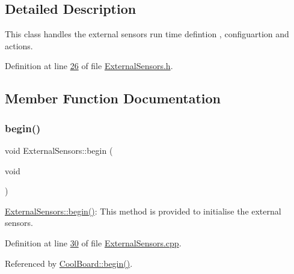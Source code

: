 \subsection{Detailed Description}
This class handles the external sensors run time defintion , configuartion and actions. 

Definition at line \hyperlink{_external_sensors_8h_source_l00026}{26} of file \hyperlink{_external_sensors_8h_source}{External\+Sensors.\+h}.



\subsection{Member Function Documentation}
\mbox{\label{class_external_sensors_a58ede0d786a86417254708870f04a21e}} 
\subsubsection{\texorpdfstring{begin()}{begin()}}
{\footnotesize\ttfamily void External\+Sensors\+::begin (\begin{DoxyParamCaption}\item[{void}]{ }\end{DoxyParamCaption})}

\hyperlink{class_external_sensors_a58ede0d786a86417254708870f04a21e}{External\+Sensors\+::begin()}\+: This method is provided to initialise the external sensors. 

Definition at line \hyperlink{_external_sensors_8cpp_source_l00030}{30} of file \hyperlink{_external_sensors_8cpp_source}{External\+Sensors.\+cpp}.



Referenced by \hyperlink{_cool_board_8cpp_source_l00021}{Cool\+Board\+::begin()}.



